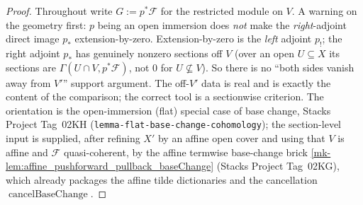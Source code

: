 \begin{proof}
  \leanok{}
  Throughout write \(G := p^*\mathcal{F}\) for the restricted module on \(V\). A warning on the
  geometry first: \(p\) being an open immersion does \emph{not} make the \emph{right}-adjoint
  direct image \(p_*\) extension-by-zero. Extension-by-zero is the \emph{left} adjoint \(p_!\);
  the right adjoint \(p_*\) has genuinely nonzero sections off \(V\) (over an open \(U \subseteq
  X\) its sections are \(\Gamma(U \cap V, p^*\mathcal{F})\), not \(0\) for \(U \not\subseteq V\)).
  So there is no ``both sides vanish away from \(V'\)'' support argument. The off-\(V'\) data is
  real and is exactly the content of the comparison; the correct tool is a sectionwise criterion.
  The orientation is the open-immersion (flat) special case of base change, Stacks Project
  Tag~02KH (\texttt{lemma-flat-base-change-cohomology}); the section-level input is
  supplied, after refining \(X'\) by an affine open cover and using that \(V\) is affine and
  \(\mathcal{F}\) quasi-coherent, by the affine termwise base-change brick
  \ref{mk-lem:affine_pushforward_pullback_baseChange} (Stacks Project Tag~02KG), which already
  packages the affine tilde dictionaries and the cancellation
  \(\operatorname{cancelBaseChange}\).


\end{proof}
